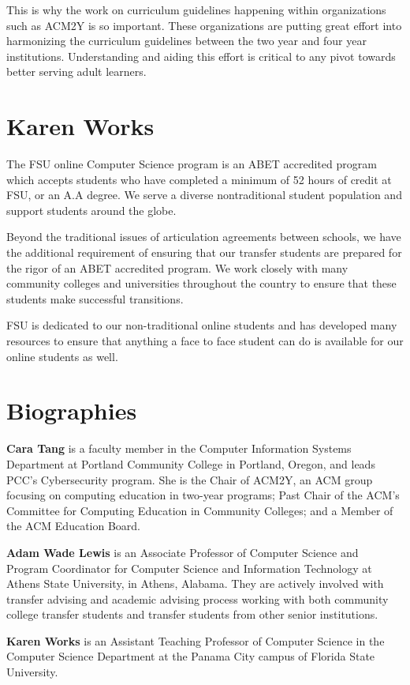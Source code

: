 \documentclass{article}
\begin{document}
This is why the work on curriculum guidelines happening
within organizations such as ACM2Y is so
important.  These organizations are putting great effort into
harmonizing the curriculum guidelines between the two year and four year
institutions. Understanding and aiding this effort is critical to any
pivot towards better serving adult learners.

\section{Karen Works}
The FSU online Computer Science program is an ABET accredited program which accepts students who have completed a minimum of 52 hours of credit at FSU, or an A.A degree. We serve a diverse nontraditional student population and support students around the globe.
 
 Beyond the traditional issues of articulation agreements between schools, we have the additional requirement of ensuring that our transfer students are prepared for the rigor of an ABET accredited program. We work closely with many community colleges and universities throughout the country to ensure that these students make successful transitions.
 
FSU is dedicated to our non-traditional online students and has
developed many resources to ensure that anything a face to face student
can do is available for our online students as well.

\section{Biographies}
\textbf{Cara Tang} is a faculty member in the Computer Information Systems Department at Portland Community College in Portland, Oregon, and leads PCC's Cybersecurity program. She is the Chair of ACM2Y, an ACM group focusing on computing education in two-year programs; Past Chair of the ACM’s Committee for Computing Education in Community Colleges; and a Member of the ACM Education Board.

\noindent
\textbf{Adam Wade Lewis} is an Associate Professor of Computer Science
and Program Coordinator for Computer Science and Information Technology
at Athens State University, in Athens, Alabama.  They are actively
involved with transfer advising and academic advising process working
with both community college transfer students and transfer students from
other senior institutions.

\noindent
\textbf{Karen Works} is an Assistant Teaching Professor of Computer
Science in the Computer Science Department at the Panama City campus of
Florida State University.  
\end{document}
